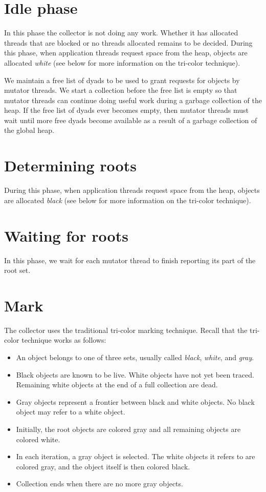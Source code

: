 \section{Idle phase}

In this phase the collector is not doing any work.  Whether it
has allocated threads that are blocked or no threads allocated
remains to be decided.  During this phase, when application threads
request space from the heap, objects are allocated \emph{white}
(see below for more information on the tri-color technique).

We maintain a free list of dyads to be used to grant requests for
objects by mutator threads.  We start a collection before the free
list is empty so that mutator threads can continue doing useful work
during a garbage collection of the heap.  If the free list of
dyads ever becomes empty, then mutator threads must wait until more
free dyads become available as a result of a garbage collection of the
global heap.

\section{Determining roots}

During this phase, when application
threads request space from the heap, objects are allocated
\emph{black} (see below for more information on the tri-color
technique).

\section{Waiting for roots}

In this phase, we wait for each mutator thread to finish reporting its
part of the root set.

\section{Mark}

The collector uses the traditional tri-color marking
technique.  Recall that the tri-color technique works as follows:

\begin{itemize}
\item An object belongs to one of three sets, usually called
  \emph{black}, \emph{white}, and \emph{gray}.
\item Black objects are known to be live.  White objects have not yet
  been traced.  Remaining white objects at the end of a full
  collection are dead.
\item Gray objects represent a frontier between black and white
  objects.  No black object may refer to a white object.
\item Initially, the root objects are colored gray and all remaining
  objects are colored white.
\item In each iteration, a gray object is selected.  The white objects
  it refers to are colored gray, and the object itself is then colored
  black.
\item Collection ends when there are no more gray objects.
\end{itemize}

